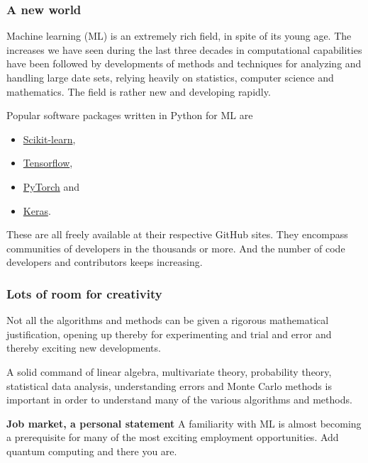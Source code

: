 \documentclass{beamer}
\begin{document}
\begin{frame}
\frametitle{A new world}

\begin{block}{}
Machine learning (ML) is an extremely rich field, in spite of its young age. The
increases we have seen during the last three decades in computational
capabilities have been followed by developments of methods and
techniques for analyzing and handling large date sets, relying heavily
on statistics, computer science and mathematics.  The field is rather
new and developing rapidly. 

Popular software packages written in Python for ML are

\begin{itemize}
\item \href{{http://scikit-learn.org/stable/}}{Scikit-learn}, 

\item \href{{https://www.tensorflow.org/}}{Tensorflow},

\item \href{{http://pytorch.org/}}{PyTorch} and 

\item \href{{https://keras.io/}}{Keras}.
\end{itemize}

\noindent
These are all freely available at their respective GitHub sites. They 
encompass communities of developers in the thousands or more. And the number
of code developers and contributors keeps increasing.
\end{block}
\end{frame}

\begin{frame}
\frametitle{Lots of room for creativity}

\begin{block}{}
Not all the
algorithms and methods can be given a rigorous mathematical
justification, opening up thereby for experimenting
and trial and error and thereby exciting new developments. 
\end{block}

\begin{block}{}
A solid command of linear algebra, multivariate theory, 
probability theory, statistical data analysis,
understanding errors and Monte Carlo methods is important in order to understand many of the 
various algorithms and methods. 
\end{block}

\begin{block}{\textbf{Job market, a personal statement} }
A familiarity with ML is almost becoming a prerequisite for many of the most exciting employment 
opportunities. Add quantum computing and there you are.
\end{block}
\end{frame}
\end{document}
